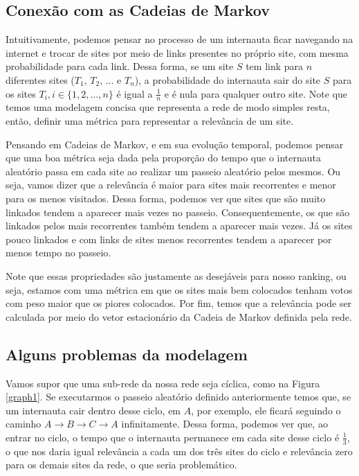 \documentclass{article}
\begin{document}
\subsection*{Conexão com as Cadeias de Markov}

Intuitivamente, podemos pensar no processo de um internauta ficar navegando na internet e trocar de sites por meio de links presentes no próprio site, com mesma probabilidade para cada link. Dessa forma, se um site $S$ tem link para $n$ diferentes sites ($T_1$, $T_2$, $\dots$ e $T_n$), a probabilidade do internauta sair do site $S$ para os sites $T_i, i \in \{1, 2, \dots, n\}$ é igual a $\frac{1}{n}$ e é nula para qualquer outro site. Note que temos uma modelagem concisa que representa a rede de modo simples resta, então, definir uma métrica para representar a relevância de um site.

Pensando em Cadeias de Markov, e em sua evolução temporal, podemos pensar que uma boa métrica seja dada pela proporção do tempo que o internauta aleatório passa em cada site ao realizar um passeio aleatório pelos mesmos. Ou seja, vamos dizer que a relevância é maior para sites mais recorrentes e menor para os menos visitados. Dessa forma, podemos ver que sites que são muito linkados tendem a aparecer mais vezes no passeio. Consequentemente, os que são linkados pelos mais recorrentes também tendem a aparecer mais vezes. Já os sites pouco linkados e com links de sites menos recorrentes tendem a aparecer por menos tempo no passeio.

Note que essas propriedades são justamente as desejáveis para nosso ranking, ou seja, estamos com uma métrica em que os sites mais bem colocados tenham votos com peso maior que os piores colocados. Por fim, temos que a relevância pode ser calculada por meio do vetor estacionário da Cadeia de Markov definida pela rede.

\subsection*{Alguns problemas da modelagem}

Vamos supor que uma sub-rede da nossa rede seja cíclica, como na Figura \ref{graph1}. Se executarmos o passeio aleatório definido anteriormente temos que, se um internauta cair dentro desse ciclo, em $A$, por exemplo, ele ficará seguindo o caminho $A\to B\to C\to A$ infinitamente. Dessa forma, podemos ver que, ao entrar no ciclo, o tempo que o internauta permanece em cada site desse ciclo é $\frac{1}{3}$, o que nos daria igual relevância a cada um dos três sites do ciclo e relevância zero para os demais sites da rede, o que seria problemático.
\end{document}
